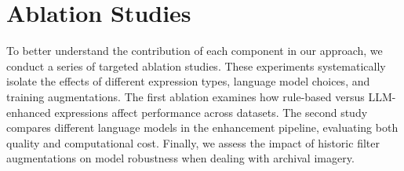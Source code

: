 \begin{table}[H]
\centering
\caption{Cross-dataset validation results for RSRefSeg variants (ours) and published baselines (historic scores in \textcolor{blue}{blue}; ``--'' indicates metrics not reported in the cited work).}
\label{tab:combined_training_results}
\end{table}

\section{Ablation Studies}

To better understand the contribution of each component in our approach, we conduct a series of targeted ablation studies. These experiments systematically isolate the effects of different expression types, language model choices, and training augmentations. The first ablation examines how rule-based versus LLM-enhanced expressions affect performance across datasets. The second study compares different language models in the enhancement pipeline, evaluating both quality and computational cost. Finally, we assess the impact of historic filter augmentations on model robustness when dealing with archival imagery.

